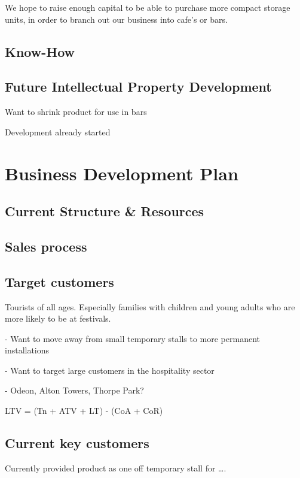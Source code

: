 \documentclass{article}
\begin{document}
We hope to raise enough capital to be able to purchase more compact storage units, in order to branch out our business into cafe's or bars.

  \subsection{Know-How}

  \subsection{Future Intellectual Property Development}

  Want to shrink product for use in bars

  Development already started

\section{Business Development Plan}

  \subsection{Current Structure \& Resources}

  \subsection{Sales process}

  \subsection{Target customers}
Tourists of all ages. Especially families with children and young adults
who are more likely to be at festivals.

 - Want to move away from small temporary stalls to more permanent
installations

 - Want to target large customers in the hospitality sector

 - Odeon, Alton Towers, Thorpe Park?

   LTV = (Tn + ATV + LT) - (CoA + CoR) 

  \subsection{Current key customers}

  Currently provided product as one off temporary stall for ….
\end{document}
